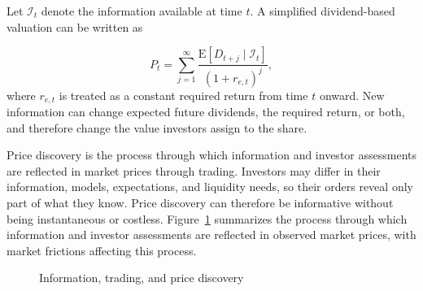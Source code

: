 Let \(\mathcal{I}_t\) denote the information available at time \(t\). A simplified dividend-based valuation can be written as

\begin{equation}
P_t
=
\sum_{j=1}^{\infty}
\frac{\mathrm{E}[D_{t+j}\mid\mathcal{I}_t]}
{(1+r_{e,t})^j},
\label{eq:ch9-information-price}
\end{equation}
where \(r_{e,t}\) is treated as a constant required return from time \(t\) onward. New information can change expected future dividends, the required return, or both, and therefore change the value investors assign to the share.

Price discovery is the process through which information and investor assessments are reflected in market prices through trading. Investors may differ in their information, models, expectations, and liquidity needs, so their orders reveal only part of what they know. Price discovery can therefore be informative without being instantaneous or costless. Figure~\ref{fig:ch9-price-discovery} summarizes
the process through which information and investor
assessments are reflected in observed market prices,
with market frictions affecting this process.


\begin{figure}[H]

\centering


\caption{Information, trading, and price discovery}
\label{fig:ch9-price-discovery}
\end{figure}

